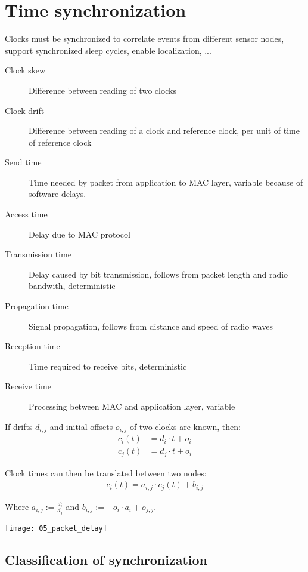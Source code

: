 \section{Time synchronization}

Clocks must be synchronized to correlate events from different sensor nodes,
support synchronized sleep cycles, enable localization, ...

\begin{description}
		\item[Clock skew] Difference between reading of two clocks
		\item[Clock drift] Difference between reading of a clock and reference
				clock, per unit of time of reference clock
		\item[Send time] Time needed by packet from application to MAC layer,
				variable because of software delays.
		\item[Access time] Delay due to MAC protocol
		\item[Transmission time] Delay caused by bit transmission, follows from packet length and radio bandwith, deterministic
		\item[Propagation time] Signal propagation, follows from distance and speed of radio waves
		\item[Reception time] Time required to receive bits, deterministic
		\item[Receive time] Processing between MAC and application layer, variable
\end{description}

If drifts $d_{i, j}$ and initial offsets $o_{i, j}$ of two clocks are known,
then:
\begin{align*}
		c_i(t) & = d_i \cdot t + o_i \\
		c_j(t) & = d_j \cdot t + o_i
\end{align*}

Clock times can then be translated between two nodes:
\begin{align*}
		c_i(t) = a_{i, j} \cdot c_j(t) + b_{i, j}
\end{align*}

Where $a_{i, j}:= \frac{d_i}{d_j}$ and $b_{i, j} := - o_i \cdot a_i + o_{j, j}$.

\texttt{[image: 05\_packet\_delay]}

\subsection{Classification of synchronization}


